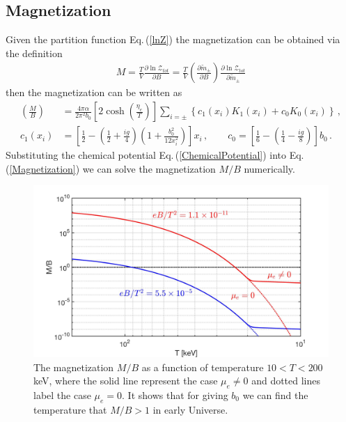 \documentclass[universe,article,submit,moreauthors,pdftex,a4paper]{Definitions/mdpi}
\newcommand{\req}[1]{Eq.\,(\ref{#1})}
\begin{document}
\subsection{Magnetization}\label{sec:Magnetization}
\noindent Given the partition function \req{lnZ} the magnetization can be obtained via the definition
\begin{align}
M=\frac{T}{V}\frac{\partial \ln\mathcal{Z}_{tot}}{\partial B}=\frac{T}{V}\left(\frac{\partial\tilde m_\pm}{\partial B}\right)\frac{\partial \ln\mathcal{Z}_{tot}}{\partial\tilde m_\pm}
\end{align}
then the magnetization can be written as
\begin{align}\label{Magnetization}
    \left(\frac{M}{B}\right)&=\frac{4\pi\alpha}{2\pi^2b_0}\left[2\cosh\left(\frac{\eta_{e}}{T}\right)\right]\sum_{i=\pm}\left\{c_{1}(x_{i})K_1(x_i)+c_{0}K_0(x_i)\right\}\,,\\
    c_{1}(x_{i}) &= \left[\frac{1}{2}-\left(\frac{1}{2}+\frac{ig}{4}\right)\left(1+\frac{b^2_0}{12x^2_i}\right)\right]x_i\,,\qquad c_{0} = \left[\frac{1}{6}-\left(\frac{1}{4}-\frac{ig}{8}\right)\right]b_0\,.
\end{align}
Substituting the chemical potential \req{ChemicalPotential} into \req{Magnetization} we can solve the magnetization $M/B$ numerically.
\begin{figure}[ht]
\centering
\includegraphics[width=\textwidth]{./plots/MagnetizationFinal_200keV.jpg}
\caption{The magnetization $M/B$ as a function of temperature $10<T<200$ keV, where the solid line represent the case $\mu_e\neq0$ and dotted lines label the case $\mu_e=0$.  It shows that for giving $b_0$ we can find the temperature that $M/B>1$ in early Universe.}
\label{Case2_fig} 
\end{figure}
\end{document}

